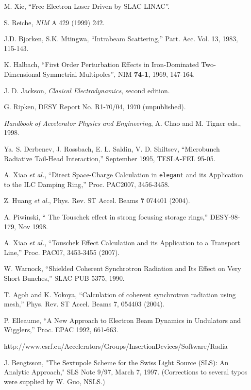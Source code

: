 \documentclass[11pt]{article}
\begin{document}
\begin{thebibliography}{9}
 M. Xie, ``Free Electron Laser Driven by SLAC
LINAC''.

 S. Reiche, {\em NIM} A 429 (1999) 242.

  J.D. Bjorken, S.K. Mtingwa, ``Intrabeam Scattering,'' Part. Acc. Vol. 13, 
  1983, 115-143.

    K. Halbach, ``First Order Perturbation Effects in Iron-Dominated Two-Dimensional Symmetrial Multipoles'',
    NIM {\bf 74-1}, 1969, 147-164.

  J. D. Jackson, {\em Clasical Electrodynamics}, second edition.

 G. Ripken, DESY Report No. R1-70/04, 1970 (unpublished).

  {\em Handbook of Accelerator Physics and Engineering}, A. Chao and M. Tigner eds., 1998.

  Ya. S. Derbenev, J. Rossbach, E. L. Saldin, V. D. Shiltsev, ``Microbunch Radiative Tail-Head
  Interaction,'' September 1995, TESLA-FEL 95-05.

  A. Xiao {\em et al.}, ``Direct Space-Charge Calculation in {\tt elegant} and its Application to the
 ILC Damping Ring,'' Proc. PAC2007, 3456-3458.

  Z. Huang {\em et al.}, Phys. Rev. ST Accel. Beams {\bf 7} 074401 (2004).

  A. Piwinski, `` The Touschek effect in strong focusing storage rings,'' DESY-98-179, Nov 1998.

  A. Xiao {\em et al.}, ``Touschek Effect Calculation and its Application to a Transport Line,''
  Proc. PAC07, 3453-3455 (2007).

  W. Warnock, ``Shielded Coherent Synchrotron Radiation and Its Effect on Very Short Bunches,'' SLAC-PUB-5375, 1990.

  T. Agoh and K. Yokoya, ``Calculation of coherent synchrotron radiation using mesh,'' Phys. Rev. ST Accel. Beams 7,
  054403 (2004).

  P. Elleaume, ``A New Approach to Electron Beam Dynamics in Undulators and Wigglers,'' Proc. EPAC 1992, 661-663.

  http://www.esrf.eu/Accelerators/Groups/InsertionDevices/Software/Radia

 J. Bengtsson, "The Sextupole Scheme for the Swiss Light Source (SLS): An Analytic Approach," SLS Note 9/97,
 March 7, 1997. (Corrections to several typos were supplied by W. Guo, NSLS.)

\end{thebibliography}
\end{document}
